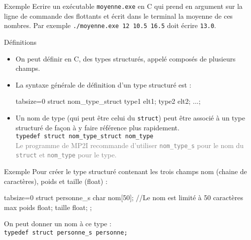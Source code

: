 \documentclass[10pt]{beamer}
\begin{document}
\begin{frame}[fragile]{\Ctitle}{\stitle}
	\begin{exampleblock}{Exemple}
		Ecrire un exécutable {\tt moyenne.exe} en C qui prend en argument sur la ligne de commande des flottants et écrit dans le terminal la moyenne de ces nombres.
		Par exemple {\tt ./moyenne.exe 12 10.5 16.5} doit écrire  {\tt 13.0}.
		\onslide<2->{
			\inputpartC{\SPATH/moyenne.c}{}{\small}{1}{12}
		}
	\end{exampleblock}
\end{frame}

\begin{frame}[fragile]{\Ctitle}{\stitle}
	\begin{block}{Définitions}
		\begin{itemize}
			\item<1-> On peut définir en C, des types structurés, appelé  composés de plusieurs champs.
			\item<2-> La syntaxe générale de définition d'un type structuré est :
				\begin{langageC*}{tabsize=0}
					struct nom_type_struct {
					    type1 elt1;
					    type2 elt2;
					    ...};
				\end{langageC*}
			\item<3-> Un nom de type (qui peut être celui du {\tt struct}) peut être associé à un type structuré de façon à y faire référence plus rapidement.\\
				\texttt{typedef struct nom_type_struct nom_type}\\
				\textcolor{gray}{Le programme de MP2I recommande d'utiliser {\tt nom\_type\_s} pour le nom du {\tt struct} et {\tt nom\_type} pour le type.}
		\end{itemize}
	\end{block}
\end{frame}

\begin{frame}[fragile]{\Ctitle}{\stitle}
	\begin{exampleblock}{Exemple}
		Pour créer le type structuré  contenant les trois champs nom (chaine de caractères), poids et taille (float) :
		\begin{langageC*}{tabsize=0}
			struct personne_s {
			    char nom[50]; //Le nom est limité à 50 caractères max
			    poids float;
			    taille float;
			};
		\end{langageC*}
		On peut donner un nom à ce type : \\
		\texttt{typedef struct personne_s personne;}
	\end{exampleblock}
\end{frame}
\end{document}
